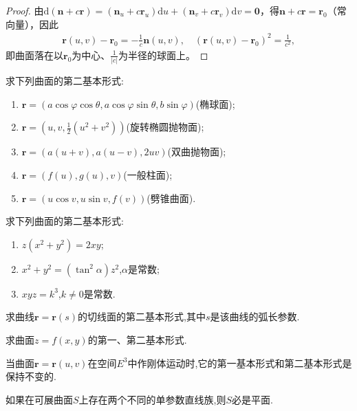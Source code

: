 \documentclass[../../main.tex]{subfiles}%
\begin{document}
\begin{proof}
由$\mathrm{d}(\boldsymbol{n}+c\boldsymbol{r})=(\boldsymbol{n}_u+c\boldsymbol{r}_u)\mathrm{d}u+(\boldsymbol{n}_v+c\boldsymbol{r}_v)\mathrm{d}v=\boldsymbol{0}$，得$\boldsymbol{n}+c\boldsymbol{r}=\boldsymbol{r}_0$（常向量），因此
\begin{align*}
\boldsymbol{r}(u,v)-\boldsymbol{r}_0=-\frac{1}{c}\boldsymbol{n}(u,v),\quad (\boldsymbol{r}(u,v)-\boldsymbol{r}_0)^2=\frac{1}{c^2},
\end{align*}
即曲面落在以$\boldsymbol{r}_0$为中心、$\frac{1}{|c|}$为半径的球面上。

\end{proof}



\begin{example}
求下列曲面的第二基本形式:
\begin{enumerate}[(1)]
\item $\bm{r} = (a\cos\varphi\cos\theta,a\cos\varphi\sin\theta,b\sin\varphi)$(椭球面);
\item $\bm{r} = \left(u,v,\frac{1}{2}(u^2+v^2)\right)$(旋转椭圆抛物面);
\item $\bm{r} = (a(u+v),a(u-v),2uv)$(双曲抛物面);
\item $\bm{r} = (f(u),g(u),v)$(一般柱面);
\item $\bm{r} = (u\cos v,u\sin v,f(v))$(劈锥曲面).
\end{enumerate}
\end{example}

\begin{example}
求下列曲面的第二基本形式:
\begin{enumerate}[(1)]
\item $z(x^2+y^2)=2xy$;
\item $x^2+y^2=(\tan^2\alpha)z^2$,$\alpha$是常数;
\item $xyz=k^3$,$k\neq0$是常数.
\end{enumerate}
\end{example}

\begin{example}
求曲线$\bm{r}=\bm{r}(s)$的切线面的第二基本形式,其中$s$是该曲线的弧长参数.
\end{example}

\begin{example}
求曲面$z=f(x,y)$的第一、第二基本形式.
\end{example}

\begin{example}
当曲面$\bm{r}=\bm{r}(u,v)$在空间$E^3$中作刚体运动时,它的第一基本形式和第二基本形式是保持不变的.
\end{example}

\begin{example}
如果在可展曲面$S$上存在两个不同的单参数直线族,则$S$必是平面.
\end{example}
\end{document}

